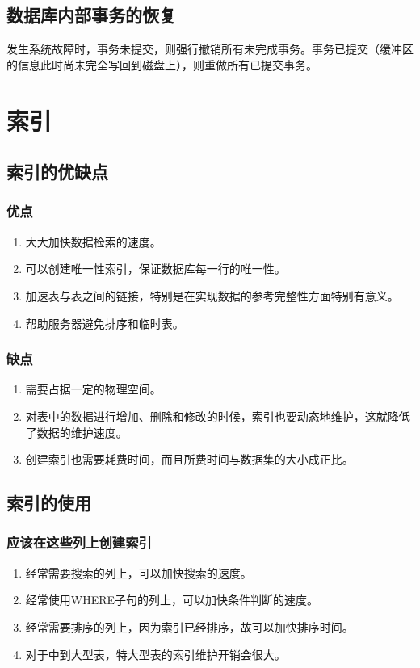 \documentclass[main.tex]{subfiles}
\begin{document}
\subsection{数据库内部事务的恢复}
发生系统故障时，事务未提交，则强行撤销所有未完成事务。事务已提交（缓冲区的信息此时尚未完全写回到磁盘上），则重做所有已提交事务。

\section{索引}
\subsection{索引的优缺点}
\subsubsection{优点}
\begin{enumerate}
    \item 大大加快数据检索的速度。
    \item 可以创建唯一性索引，保证数据库每一行的唯一性。
    \item 加速表与表之间的链接，特别是在实现数据的参考完整性方面特别有意义。
    \item 帮助服务器避免排序和临时表。
\end{enumerate}
\subsubsection{缺点}
\begin{enumerate}
    \item 需要占据一定的物理空间。
    \item 对表中的数据进行增加、删除和修改的时候，索引也要动态地维护，这就降低了数据的维护速度。
    \item 创建索引也需要耗费时间，而且所费时间与数据集的大小成正比。
\end{enumerate}

\subsection{索引的使用}
\subsubsection{应该在这些列上创建索引}
\begin{enumerate}
    \item 经常需要搜索的列上，可以加快搜索的速度。
    \item 经常使用WHERE子句的列上，可以加快条件判断的速度。
    \item 经常需要排序的列上，因为索引已经排序，故可以加快排序时间。
    \item 对于中到大型表，特大型表的索引维护开销会很大。
\end{enumerate}
\end{document}
